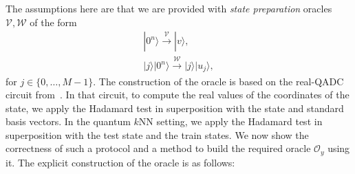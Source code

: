 \documentclass[a4paper,twocolumn,11pt,unpublished]{quantumarticle}
\newcommand{\rang}{\rangle}
\begin{document}
        
    The assumptions here are that we are provided with \textit{state preparation} oracles $\mathcal V, \mathcal W$ of the form
        \begin{gather}
            |0^n\rang  \xrightarrow{\mathcal V} |v\rang,\\
            |j\rang |0^n\rang \xrightarrow{\mathcal W} |j\rang|u_j \rang,
        \end{gather}
        for $j \in \{0, \ldots, M-1\}$. The construction of the oracle is based on the real-QADC circuit from~\cite{Mitarai2019}. In that circuit, to compute the real values of the coordinates of the state, we apply the Hadamard test in superposition with the state and standard basis vectors. In the quantum $k$NN setting, we apply the Hadamard test in superposition with the test state and the train states. We now show the correctness of such a protocol and a method to build the required oracle $ \mathcal O_y$ using it. The explicit construction of the oracle is as follows:
\end{document}
